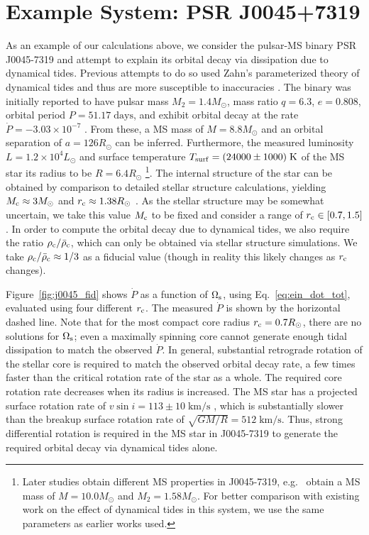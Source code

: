 \documentclass[
        fleqn,
        usenatbib,
    ]{mnras}
\begin{document}
\section{Example System: PSR J0045+7319}\label{s:j00457319}

As an example of our calculations above, we consider the pulsar-MS binary PSR
J0045-7319 \citep{bell1995psr} and attempt to explain its orbital decay via
dissipation due to dynamical tides. Previous attempts to do so used Zahn's
parameterized theory of dynamical tides and thus are more susceptible to
inaccuracies \citep[e.g.][]{lai1996, kumar1998}. The binary was initially
reported to have pulsar mass $M_2 = 1.4M_{\odot}$, mass ratio $q = 6.3$, $e =
0.808$, orbital period $P = 51.17\;\mathrm{days}$, and exhibit orbital decay at
the rate $\dot{P} = -3.03\times 10^{-7}$ \citep{kaspi1996params}. From these, a
MS mass of $M = 8.8M_{\odot}$ and an orbital separation of $a = 126R_{\odot}$
can be inferred. Furthermore, the measured luminosity $L = 1.2 \times
10^4L_{\odot}$ and surface temperature $T_{\rm surf} = (24000 \pm
1000)\;\mathrm{K}$ of the MS star its radius to be $R = 6.4R_{\odot}$
\citep{kaspi1996params}\footnote{Later studies obtain different MS properties in
J0045-7319, e.g.\ \citet{thorsett1999neutron} obtain a MS mass of $M = 10.0
M_{\odot}$ and $M_2 = 1.58M_{\odot}$. For better comparison with existing work
on the effect of dynamical tides in this system, we use the same parameters as
earlier works used.}. The internal structure of the star can be obtained by
comparison to detailed stellar structure calculations, yielding $M_{\rm c}
\approx 3M_{\odot}$ and $r_{\rm c} \approx 1.38R_{\odot}$ \citep{kumar1998}. As
the stellar structure may be somewhat uncertain, we take this value $M_{\rm c}$
to be fixed and consider a range of $r_{\rm c} \in [0.7, 1.5]$. In order to
compute the orbital decay due to dynamical tides, we also require the ratio
$\rho_{\rm c} / \bar{\rho}_{\rm c}$, which can only be obtained via stellar
structure simulations. We take $\rho_{\rm c} / \bar{\rho}_{\rm c} \approx 1/3$
as a fiducial value (though in reality this likely changes as $r_{\rm c}$
changes).

Figure~\ref{fig:j0045_fid} shows $\dot{P}$ as a function of $\Omega_{\rm s}$,
using Eq.~\eqref{eq:ein_dot_tot}, evaluated using four different $r_{\rm c}$.
The measured $\dot{P}$ is shown by the horizontal dashed line. Note that for the
most compact core radius $r _{\rm c} = 0.7R_{\odot}$, there are no solutions for
$\Omega_{\rm s}$; even a maximally spinning core cannot generate enough tidal
dissipation to match the observed $\dot{P}$. In general, substantial retrograde
rotation of the stellar core is required to match the observed orbital decay
rate, a few times faster than the critical rotation rate of the star as a whole.
The required core rotation rate decreases when its radius is increased. The MS
star has a projected surface rotation rate of $v \sin i = 113 \pm
10\;\mathrm{km/s}$ \citep{bell1995psr}, which is substantially slower than the
breakup surface rotation rate of $\sqrt{GM / R} = 512\;\mathrm{km/s}$. Thus,
strong differential rotation is required in the MS star in J0045-7319 to
generate the required orbital decay via dynamical tides alone.
\end{document}
